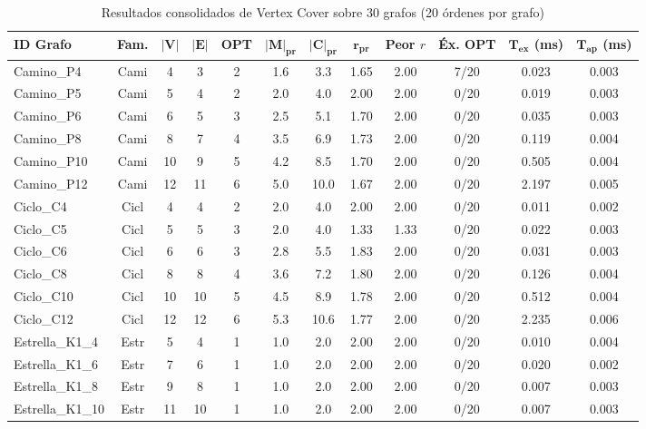 \begin{table}[H]
    \caption{Resultados consolidados de Vertex Cover sobre 30 grafos (20 órdenes por grafo)}
    \label{tab:resumen_vc}
    \centering
    \scriptsize
    \begin{tabular*}{\textwidth}{@{\extracolsep{\fill}}lccccccccccc}
        \toprule
        \textbf{ID Grafo} & \textbf{Fam.} & $\mathbf{|V|}$ & $\mathbf{|E|}$ & \textbf{OPT} & $\mathbf{|M|_{pr}}$ & $\mathbf{|C|_{pr}}$ & $\mathbf{r_{pr}}$ & \textbf{Peor $r$} & \textbf{Éx. OPT} & $\mathbf{T_{\text{ex}}}$ (ms) & $\mathbf{T_{\text{ap}}}$ (ms) \\
        \midrule
Camino\_P4 & Cami & 4 & 3 & 2 & 1.6 & 3.3 & 1.65 & 2.00 & 7/20 & 0.023 & 0.003 \\
Camino\_P5 & Cami & 5 & 4 & 2 & 2.0 & 4.0 & 2.00 & 2.00 & 0/20 & 0.019 & 0.003 \\
Camino\_P6 & Cami & 6 & 5 & 3 & 2.5 & 5.1 & 1.70 & 2.00 & 0/20 & 0.035 & 0.003 \\
Camino\_P8 & Cami & 8 & 7 & 4 & 3.5 & 6.9 & 1.73 & 2.00 & 0/20 & 0.119 & 0.004 \\
Camino\_P10 & Cami & 10 & 9 & 5 & 4.2 & 8.5 & 1.70 & 2.00 & 0/20 & 0.505 & 0.004 \\
Camino\_P12 & Cami & 12 & 11 & 6 & 5.0 & 10.0 & 1.67 & 2.00 & 0/20 & 2.197 & 0.005 \\
Ciclo\_C4 & Cicl & 4 & 4 & 2 & 2.0 & 4.0 & 2.00 & 2.00 & 0/20 & 0.011 & 0.002 \\
Ciclo\_C5 & Cicl & 5 & 5 & 3 & 2.0 & 4.0 & 1.33 & 1.33 & 0/20 & 0.022 & 0.003 \\
Ciclo\_C6 & Cicl & 6 & 6 & 3 & 2.8 & 5.5 & 1.83 & 2.00 & 0/20 & 0.031 & 0.003 \\
Ciclo\_C8 & Cicl & 8 & 8 & 4 & 3.6 & 7.2 & 1.80 & 2.00 & 0/20 & 0.126 & 0.004 \\
Ciclo\_C10 & Cicl & 10 & 10 & 5 & 4.5 & 8.9 & 1.78 & 2.00 & 0/20 & 0.512 & 0.004 \\
Ciclo\_C12 & Cicl & 12 & 12 & 6 & 5.3 & 10.6 & 1.77 & 2.00 & 0/20 & 2.235 & 0.006 \\
Estrella\_K1\_4 & Estr & 5 & 4 & 1 & 1.0 & 2.0 & 2.00 & 2.00 & 0/20 & 0.010 & 0.004 \\
Estrella\_K1\_6 & Estr & 7 & 6 & 1 & 1.0 & 2.0 & 2.00 & 2.00 & 0/20 & 0.020 & 0.002 \\
Estrella\_K1\_8 & Estr & 9 & 8 & 1 & 1.0 & 2.0 & 2.00 & 2.00 & 0/20 & 0.007 & 0.003 \\
Estrella\_K1\_10 & Estr & 11 & 10 & 1 & 1.0 & 2.0 & 2.00 & 2.00 & 0/20 & 0.007 & 0.003 \\

\end{tabular*}
\end{table}
